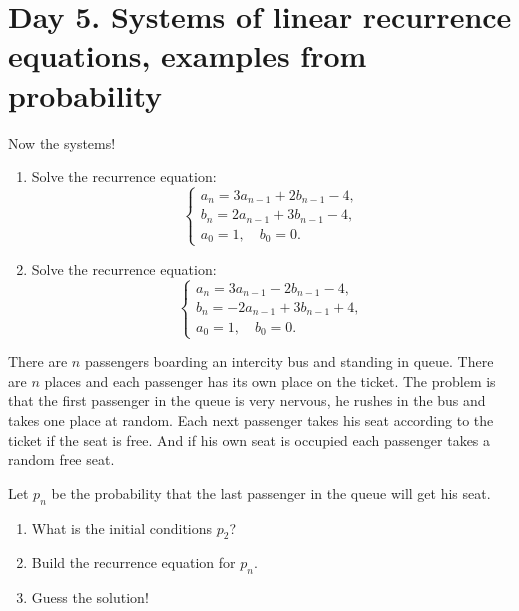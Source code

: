 \documentclass[12pt]{article}
\begin{document}
\section{Day 5. Systems of linear recurrence equations, examples from probability}


\begin{exercise}
    Now the systems!

    \begin{enumerate}[label=\alph*)]
    \item Solve the recurrence equation:
    \[
    \begin{cases}
    a_n = 3a_{n-1} + 2b_{n-1} - 4, \\
    b_n = 2a_{n-1} + 3b_{n-1} - 4, \\
    a_0 = 1, \quad b_0 = 0.
    \end{cases}
    \]
    \item Solve the recurrence equation:
    \[
    \begin{cases}
    a_n = 3a_{n-1} - 2b_{n-1} - 4, \\
    b_n = - 2a_{n-1} + 3b_{n-1} + 4, \\
    a_0 = 1, \quad b_0 = 0.
    \end{cases}
    \]
    \end{enumerate}

\end{exercise}



\begin{exercise}
There are $n$ passengers boarding an intercity bus and standing in queue. 
There are $n$ places and each passenger has its own place on the ticket. 
The problem is that the first passenger in the queue is very nervous, he rushes in the bus and takes one place at random. 
Each next passenger takes his seat according to the ticket if the seat is free. 
And if his own seat is occupied each passenger takes a random free seat. 

Let $p_n$ be the probability that the last passenger in the queue will get his seat. 
\begin{enumerate}[label=\alph*)]
    \item What is the initial conditions $p_{2}$?
    \item Build the recurrence equation for $p_{n}$.
    \item Guess the solution!
\end{enumerate}
\end{exercise}
\end{document}
